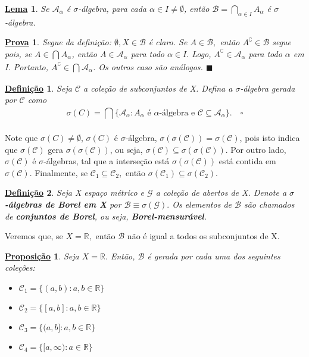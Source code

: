 \documentclass{article}
\newtheorem*{def*}{\underline{Defini\c c\~ao}}
\newtheorem*{lemma*}{\underline{Lema}}
\newtheorem*{prop*}{\underline{Proposi\c c\~ao}}
\newtheorem*{proof*}{\underline{Prova}}
\renewcommand\qedsymbol{$\blacksquare$}
\begin{document}
\begin{lemma*}
	Se \(\mathcal{A}_{\alpha }\) é \(\sigma \)-álgebra, para cada \(\alpha \in I \neq\emptyset\), então \(\mathcal{B} = \bigcap_{\alpha \in I}^{}A_{\alpha }\) é \(\sigma \)-álgebra.
\end{lemma*}
\begin{proof*}
	Segue da definição: \(\emptyset , X\in \mathcal{B}\) é claro. Se \(A\in \mathcal{B}, \) então \(A ^{\complement}\in \mathcal{B}\) segue pois, se \(A\in \bigcap_{}^{}A_{\alpha }\), então
	\(A\in \mathcal{A}_{\alpha }\) para todo \(\alpha \in I.\) Logo, \(A ^{\complement}\in \mathcal{A}_{\alpha }\) para todo \(\alpha \) em I. Portanto, \(A ^{\complement}\in \bigcap_{}^{}\mathcal{A}_{\alpha }\).
	Os outros caso são análogos. \qedsymbol
\end{proof*}
\begin{def*}
	Seja \(\mathcal{C}\) a coleção de subconjuntos de X. Defina a \(\sigma \)-álgebra gerada por \(\mathcal{C}\) como
	\[
		\sigma (C) = \bigcap_{}^{}\biggl\{\mathcal{A}_{\alpha }: A_{\alpha }\text{ é }\alpha \text{-álgebra e } \mathcal{C}\subseteq \mathcal{A}_{\alpha }\biggr\}.\quad \square
	\]
\end{def*}
Note que \(\sigma (C)\neq\emptyset\), \(\sigma (C) \) é \(\sigma \)-álgebra, \(\sigma (\sigma (\mathcal{C})) = \sigma (\mathcal{C})\), pois isto indica que \(\sigma (\mathcal{C})\) gera \(\sigma (\sigma (\mathcal{C}))\), ou seja, \(\sigma (\mathcal{C}) \subseteq \sigma (\sigma (\mathcal{C}))\). Por outro lado, \(\sigma (\mathcal{C})\) é \(\sigma \)-álgebras, tal que a interseção
está \(\sigma (\sigma (\mathcal{C}))\) está contida em \(\sigma (\mathcal{C}).\) Finalmente, se \(\mathcal{C}_{1}\subseteq \mathcal{C}_{2},\) então
\(\sigma (\mathcal{C}_{1}) \subseteq \sigma (\mathcal{C}_{2})\).
\begin{def*}
	Seja X espaço métrico e \(\mathcal{G}\) a coleção de abertos de X. Denote a \(\sigma \)\textbf{-álgebras de Borel em X} por \(\mathcal{B}\equiv \sigma (\mathcal{G}).\) Os elementos de \(\mathcal{B}\) são
	chamados de \textbf{conjuntos de Borel}, ou seja, \textbf{Borel-mensurável}.
\end{def*}
Veremos que, se \(X = \mathbb{R}, \) então \(\mathcal{B}\) não é igual a todos os subconjuntos de X.
\begin{prop*}
	Seja \(X = \mathbb{R}.\) Então, \(\mathcal{B}\) é gerada por cada uma dos seguintes coleções:
	\begin{itemize}
		\item[a)] \(\mathcal{C}_{1} = \{(a, b):a, b\in \mathbb{R}\}\)
		\item[b)] \(\mathcal{C}_{2} = \{[a, b]:a, b\in \mathbb{R}\}\)
		\item[c)] \(\mathcal{C}_{3} = \{(a, b]:a, b\in \mathbb{R}\}\)
		\item[d)] \(\mathcal{C}_{4} = \{[a, \infty):a\in \mathbb{R}\}\)
	\end{itemize}
\end{prop*}
\end{document}
